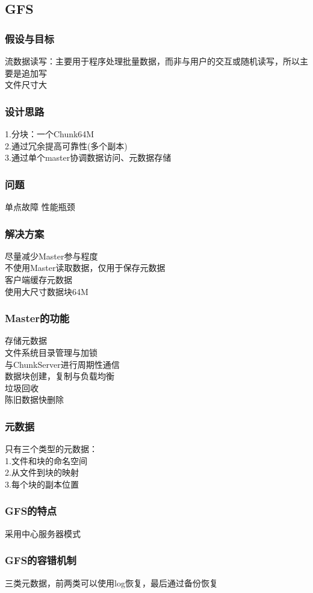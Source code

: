 \documentclass{article}
\begin{document}
\begin{CJK}{UTF8}{gbsn}
	\subsection*{GFS}
	\subsubsection*{假设与目标}
	流数据读写：主要用于程序处理批量数据，而非与用户的交互或随机读写，所以主要是追加写\\
	文件尺寸大\\
	\subsubsection*{设计思路}
	1.分块：一个Chunk64M\\
	2.通过冗余提高可靠性(多个副本)\\
	3.通过单个master协调数据访问、元数据存储\\
	\subsubsection*{问题}
	单点故障
	性能瓶颈
	\subsubsection*{解决方案}
	尽量减少Master参与程度\\
	不使用Master读取数据，仅用于保存元数据\\
	客户端缓存元数据\\
	使用大尺寸数据块64M\\
	\subsubsection*{Master的功能}
	存储元数据\\
	文件系统目录管理与加锁\\
	与ChunkServer进行周期性通信\\
	数据块创建，复制与负载均衡\\
	垃圾回收\\
	陈旧数据快删除\\
	\subsubsection*{元数据}
	只有三个类型的元数据：\\
	1.文件和块的命名空间\\
	2.从文件到块的映射\\
	3.每个块的副本位置\\
	\subsubsection*{GFS的特点}
	采用中心服务器模式\\
	
	
	\subsubsection*{GFS的容错机制}
	三类元数据，前两类可以使用log恢复，最后通过备份恢复\\
\end{CJK}
\end{document}
